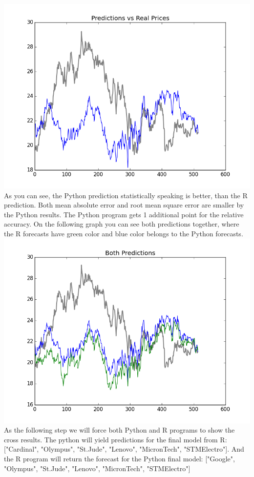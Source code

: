 \documentclass{article}
\begin{document}
\includegraphics[scale=0.75]{PythonPredictions.png}\\
As you can see, the Python prediction statistically speaking is better, than the R prediction. Both mean absolute error and root mean square error are smaller by the Python results. The Python program gets 1 additional point for the relative accuracy. On the following graph you can see both predictions together, where the R forecasts have green color and blue color belongs to the Python forecasts.\\
\includegraphics[scale=0.75]{BothPredictions.png}\\
As the following step we will force both Python and R programs to show the cross results. The python will yield predictions for the final model from R: ["Cardinal", "Olympus", "St.Jude", "Lenovo", "MicronTech", "STMElectro"]. And the R program will return the forecast for the Python final model: ["Google", "Olympus", "St.Jude", "Lenovo", "MicronTech", "STMElectro"]\\
\end{document}

